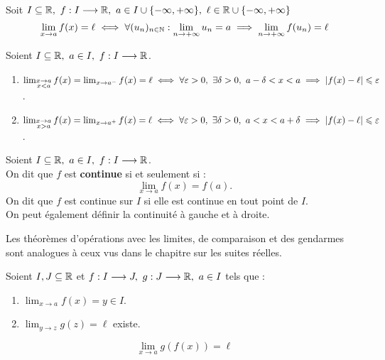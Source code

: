 \begin{theorem}
	Soit $I \subseteq \mathbb{R},\ f : I \longrightarrow \mathbb{R},\ a \in I \cup \{-\infty, +\infty\},\ \ell \in \mathbb{R} \cup \{-\infty, +\infty\}$
	\[ \lim_{x \to a} f(x) = \ell \iff \forall (u_n)_{n \in \mathbb{N}} : \lim_{n \to +\infty} u_n = a \implies \lim_{n \to +\infty} f(u_n) = \ell \]
\end{theorem}

\begin{definition}
    Soient $I \subseteq \mathbb{R},\ a \in I,\ f : I \longrightarrow \mathbb{R} $.
    \begin{enumerate}
        \item $ \lim_{\substack{x \to a \\ x < a}} f(x) = \lim_{x \to a^-} f(x) = \ell \iff \forall \varepsilon > 0,\ \exists \delta > 0,\ a - \delta < x < a \implies \abs{f(x) - \ell} \leq \varepsilon $.
        \item $\lim_{\substack{x \to a \\ x > a}} f(x) = \lim_{x \to a^+} f(x) = \ell \iff \forall \varepsilon > 0,\ \exists \delta > 0,\ a < x < a + \delta \implies \abs{f(x) - \ell} \leq \varepsilon$.
    \end{enumerate}
\end{definition}

\begin{definition}[Continuité]
	Soient $I \subseteq \mathbb{R},\ a \in I,\ f : I \longrightarrow \mathbb{R}$.
        \\ 
        On dit que $f$ est \textbf{continue} si et seulement si :
        \[\lim_{x \to a} f(x) = f(a).\] 
	On dit que $f$ est continue sur $I$ si elle est continue en tout point de $I$.\\
	On peut également définir la continuité à gauche et à droite.
\end{definition}

\begin{remark}
	Les théorèmes d'opérations avec les limites, de comparaison et des gendarmes sont analogues à ceux vus  dans le chapitre sur les suites réelles.
\end{remark}

\begin{theorem}
	Soient $I, J \subseteq \mathbb{R}$ et $f : I \longrightarrow J,\ g : J \longrightarrow \mathbb{R},\ a \in I$ tels que :
	\begin{enumerate}
		\item $\lim_{x \to a} f(x) = y \in I$.
		\item $\lim_{y \to z} g(z) = \ell$ existe.
	\end{enumerate}
	\[ \lim_{x \to a} g(f(x)) = \ell \]
\end{theorem}

